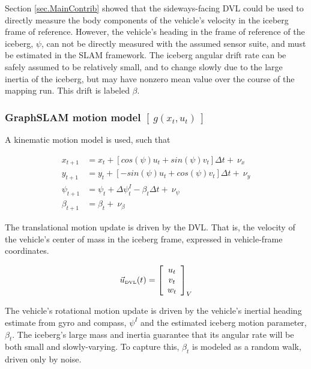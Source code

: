 Section \ref{sec.MainContrib} showed that the sideways-facing DVL could be used to directly measure the body components of the vehicle's velocity in the iceberg frame of reference. However, the vehicle's heading in the frame of reference of the iceberg, $\psi$, can not be directly measured with the assumed sensor suite, and must be estimated in the SLAM framework. The iceberg angular drift rate can be safely assumed to be relatively small, and to change slowly due to the large inertia of the iceberg, but may have nonzero mean value over the course of the mapping run. This drift is labeled $\beta$. 

\subsubsection{GraphSLAM motion model $\left[~g\left(x_t,u_t\right)~\right]$ }

A kinematic motion model is used, such that

\begin{align}
x_{t+1} &= x_t + \left[cos(\psi) u_t + sin(\psi)v_t\right]\Delta t +~ \nu_x\\
y_{t+1} &= y_t + \left[-sin(\psi) u_t + cos(\psi)v_t\right]\Delta t + ~\nu_y \\
\psi_{t+1}    &= \psi_{t} + \Delta\psi_t^I - \beta_t\Delta t + ~\nu_\psi \\
\beta_{t +1}   &= \beta_{t} + ~\nu_\beta
\end{align}


The translational motion update is driven by the DVL. That is, the velocity of the vehicle's center of mass in the iceberg frame, expressed in vehicle-frame coordinates. 

\begin{equation}
\vec{u}_\text{\tiny{DVL}}(t) = 
                    \left[\begin{array}{c}
                     u_t \\ v_t \\ w_t 
                     \end{array}\right]_V
\end{equation}

The vehicle's rotational motion update is driven by the vehicle's inertial heading estimate from gyro and compass, $\psi^I$ and the estimated iceberg motion parameter, $\beta_t$.  The iceberg's large mass and inertia guarantee that its angular rate will be both small and slowly-varying. To capture this, $\beta_t$ is modeled as a random walk, driven only by noise.


